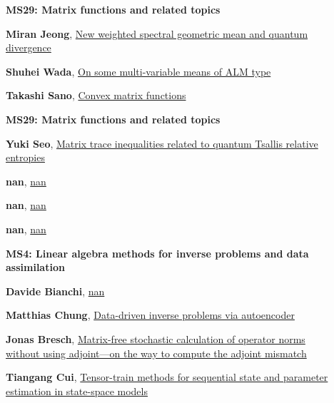 \documentclass[ILAS2025-program.tex]{subfiles}
\begin{document}
        \begin{description}
    \item[] {\color{mstitle}\textbf{MS29: Matrix functions and related topics}} 
    \item[] \hypertarget{up0123}{}\textbf{Miran Jeong}, \hyperlink{down0123}{New weighted spectral geometric mean and quantum divergence}
        \item[] \hypertarget{up0124}{}\textbf{Shuhei Wada}, \hyperlink{down0124}{On some multi-variable means of ALM type}
        \item[] \hypertarget{up0125}{}\textbf{Takashi Sano}, \hyperlink{down0125}{Convex matrix functions}
        \end{description}
    \begin{description}
    \item[] {\color{mstitle}\textbf{MS29: Matrix functions and related topics}} 
    \item[] \hypertarget{up0157}{}\textbf{Yuki Seo}, \hyperlink{down0157}{Matrix trace inequalities related to quantum Tsallis relative entropies
}
        \item[] \hypertarget{up0158}{}\textbf{nan}, \hyperlink{down0158}{nan}
        \item[] \hypertarget{up0159}{}\textbf{nan}, \hyperlink{down0159}{nan}
        \item[] \hypertarget{up0160}{}\textbf{nan}, \hyperlink{down0160}{nan}
        \end{description}
    \begin{description}
    \item[] {\color{mstitle}\textbf{MS4: Linear algebra methods for inverse problems and data assimilation}} 
    \item[] \hypertarget{up0201}{}\textbf{Davide Bianchi}, \hyperlink{down0201}{nan}
        \item[] \hypertarget{up0202}{}\textbf{Matthias Chung}, \hyperlink{down0202}{Data-driven inverse problems via autoencoder
}
        \item[] \hypertarget{up0203}{}\textbf{Jonas Bresch}, \hyperlink{down0203}{Matrix-free stochastic calculation of operator norms without using adjoint---on the way to compute the adjoint mismatch}
        \item[] \hypertarget{up0204}{}\textbf{Tiangang Cui}, \hyperlink{down0204}{Tensor-train methods for sequential state and parameter estimation in state-space models
}
        \end{description}
    \newpage
\end{document}
